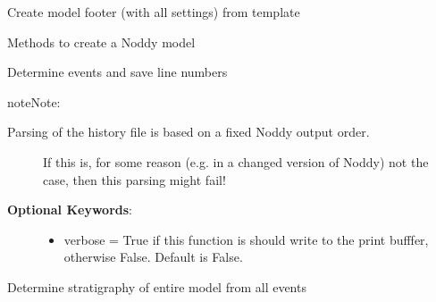 \documentclass[a4paper,10pt,english]{sphinxmanual}
\begin{document}
\begin{fulllineitems}
\begin{fulllineitems}
\label{pynoddy:pynoddy.history.NoddyHistory.create_footer_from_template}
Create model footer (with all settings) from template

\end{fulllineitems}


\begin{fulllineitems}
\label{pynoddy:pynoddy.history.NoddyHistory.create_new_history}
Methods to create a Noddy model

\end{fulllineitems}


\begin{fulllineitems}
\label{pynoddy:pynoddy.history.NoddyHistory.determine_events}
Determine events and save line numbers

\begin{notice}{note}{Note:}\begin{description}
\item[{Parsing of the history file is based on a fixed Noddy output order. }] \leavevmode
If this is, for some reason (e.g. in a changed version of Noddy) not the case, then
this parsing might fail!

\item[{\textbf{Optional Keywords}:}] \leavevmode\begin{itemize}
\item {} 
verbose = True if this function is should write to the print bufffer, otherwise False. Default is False.

\end{itemize}

\end{description}
\end{notice}

\end{fulllineitems}


\begin{fulllineitems}
\label{pynoddy:pynoddy.history.NoddyHistory.determine_model_stratigraphy}
Determine stratigraphy of entire model from all events


\end{fulllineitems}
\end{fulllineitems}
\end{document}
